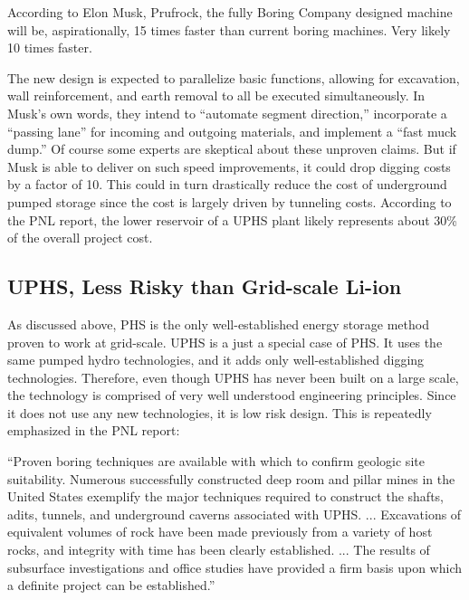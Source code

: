 \documentclass[hidelinks,12pt,a4paper]{article}
\begin{document}
\begin{displayquote}
According to Elon Musk, Prufrock, the fully Boring Company designed machine will be, aspirationally, 15 times faster than current boring machines. Very likely 10 times faster.
\end{displayquote}

The new design is expected to parallelize basic functions, allowing for excavation, wall reinforcement, and earth removal to all be executed simultaneously. In Musk's own words, they intend to “automate segment direction,” incorporate a “passing lane” for incoming and outgoing materials, and implement a  “fast muck dump.” Of course some experts are skeptical about these unproven claims. \cite{ElonMuskTunnelingTechUnderLA} But if Musk is able to deliver on such speed improvements, it could drop digging costs by a factor of 10. This could in turn drastically reduce the cost of underground pumped storage since the cost is largely driven by tunneling costs. According to the PNL report, the lower reservoir of a UPHS plant likely represents about 30\% of the overall project cost. \cite{UndergroundPumpedHydroelectricStorage}

\subsection{UPHS, Less Risky than Grid-scale Li-ion}
As discussed above, PHS is the only well-established energy storage method proven to work at grid-scale. UPHS is a just a special case of PHS. It uses the same pumped hydro technologies, and it adds only well-established digging technologies. Therefore, even though UPHS has never been built on a large scale, the technology is comprised of very well understood engineering principles. Since it does not use any new technologies, it is low risk design. This is repeatedly emphasized in the PNL report:

\begin{displayquote}
“Proven boring techniques are available with which to confirm geologic site suitability. Numerous successfully constructed deep room and pillar mines in the United States exemplify the major techniques required to construct the shafts, adits, tunnels, and underground caverns associated with UPHS.
...
Excavations of equivalent volumes of rock have been made previously from a variety of host rocks, and integrity with time has been clearly established.
...
The results of subsurface investigations and office studies have provided a firm basis upon which a definite project can be established.” \cite{UndergroundPumpedHydroelectricStorage}
\end{displayquote}
\end{document}

